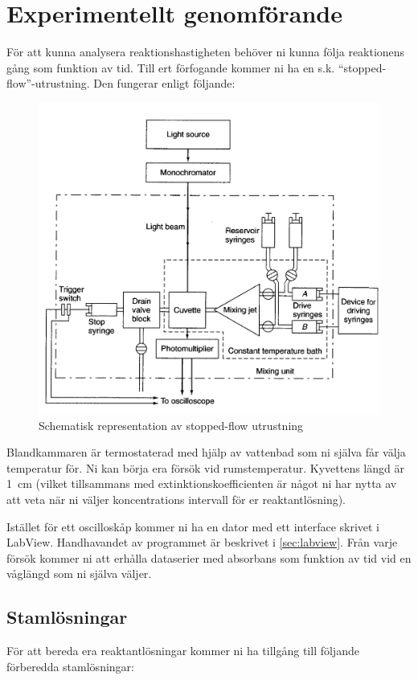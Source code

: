 \section{Experimentellt genomförande}
\label{sec:exper}
För att kunna analysera reaktionshastigheten behöver ni kunna följa
reaktionens gång som funktion av tid. Till ert förfogande kommer ni ha en
s.k. ``stopped-flow''-utrustning. Den fungerar enligt följande:

\begin{figure}[center]
  \centering
  \includegraphics[scale=0.2]{fig/stopped_flow.png}
  \caption{Schematisk representation av stopped-flow utrustning}
  \label{fig:stopped-flow}
\end{figure}

Blandkammaren är termostaterad med hjälp av vattenbad som ni själva får
välja temperatur för. Ni kan börja era försök vid
rumstemperatur. Kyvettens längd är \SI{1}{\centi\metre} (vilket
tillsammans med extinktionskoefficienten  är något ni har nytta av att
veta när ni väljer koncentrations intervall för er reaktantlösning).

Istället för ett oscilloskåp kommer ni ha en dator med ett interface
skrivet i LabView. Handhavandet av programmet är beskrivet i
\cref{sec:labview}. Från varje försök kommer ni att erhålla dataserier med
absorbans som funktion av tid vid en våglängd som ni själva väljer.

\subsection{Stamlösningar}
För att bereda era reaktantlösningar kommer ni ha tillgång till följande
förberedda stamlösningar:

